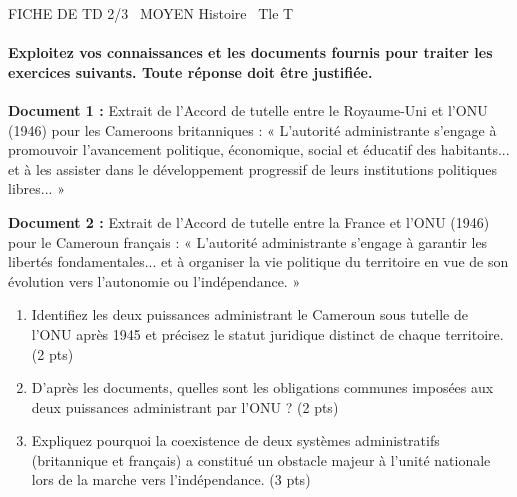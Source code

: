 \documentclass[11pt]{article}
\begin{document}
\begin{tcolorbox}[enhanced,colback=popink,colframe=popink,arc=10pt,boxrule=0pt,left=12pt,right=12pt,top=9pt,bottom=9pt]
{\color{white}\popxbold\small FICHE DE TD 2/3 \textbullet\ MOYEN \hfill Histoire \textbullet\ Tle T\par}
\end{tcolorbox}
\vspace{4pt}
\paragraph{Exploitez vos connaissances et les documents fournis pour traiter les exercices suivants. Toute réponse doit être justifiée.}

\begin{exercice}
\textbf{Document 1 :} Extrait de l'Accord de tutelle entre le Royaume-Uni et l'ONU (1946) pour les Cameroons britanniques : « L'autorité administrante s'engage à promouvoir l'avancement politique, économique, social et éducatif des habitants... et à les assister dans le développement progressif de leurs institutions politiques libres... »

\textbf{Document 2 :} Extrait de l'Accord de tutelle entre la France et l'ONU (1946) pour le Cameroun français : « L'autorité administrante s'engage à garantir les libertés fondamentales... et à organiser la vie politique du territoire en vue de son évolution vers l'autonomie ou l'indépendance. »

\begin{enumerate}
    \item Identifiez les deux puissances administrant le Cameroun sous tutelle de l'ONU après 1945 et précisez le statut juridique distinct de chaque territoire. (2 pts)
    \item D'après les documents, quelles sont les obligations communes imposées aux deux puissances administrant par l'ONU ? (2 pts)
    \item Expliquez pourquoi la coexistence de deux systèmes administratifs (britannique et français) a constitué un obstacle majeur à l'unité nationale lors de la marche vers l'indépendance. (3 pts)
\end{enumerate}
\end{exercice}
\end{document}
